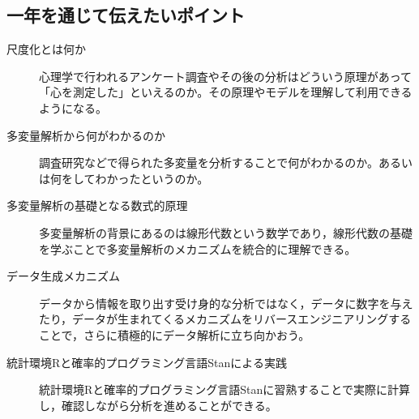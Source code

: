 \subsection*{一年を通じて伝えたいポイント}
\begin{description}
	\item[尺度化とは何か] 心理学で行われるアンケート調査やその後の分析はどういう原理があって「心を測定した」といえるのか。その原理やモデルを理解して利用できるようになる。
	\item[多変量解析から何がわかるのか] 調査研究などで得られた多変量を分析することで何がわかるのか。あるいは何をしてわかったというのか。
	\item[多変量解析の基礎となる数式的原理] 多変量解析の背景にあるのは線形代数という数学であり，線形代数の基礎を学ぶことで多変量解析のメカニズムを統合的に理解できる。
	\item[データ生成メカニズム] データから情報を取り出す受け身的な分析ではなく，データに数字を与えたり，データが生まれてくるメカニズムをリバースエンジニアリングすることで，さらに積極的にデータ解析に立ち向かおう。
	\item[統計環境Rと確率的プログラミング言語Stanによる実践] 統計環境Rと確率的プログラミング言語Stanに習熟することで実際に計算し，確認しながら分析を進めることができる。
\end{description}